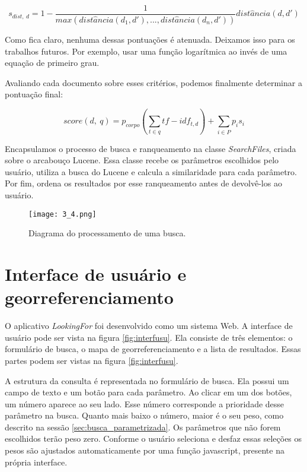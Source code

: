 \begin{displaymath}
	s_{dist,\ d} = 1 - \frac{1}{max(dist\hat{a}ncia(d_{1}, d'), ..., dist\hat{a}ncia(d_{n}, d'))}dist\hat{a}ncia(d, d')
\end{displaymath}

Como fica claro, nenhuma dessas pontuações é atenuada. Deixamos isso para os trabalhos futuros. Por exemplo, usar uma função logarítmica ao invés de uma equação de primeiro grau.

Avaliando cada documento sobre esses critérios, podemos finalmente determinar a pontuação final:

\begin{displaymath}
	score(d,\ q) = p_{corpo} \left(\sum_{t \in q} tf - idf_{t,d}\right) + \sum_{i \in P} p_{i} s_{i}
\end{displaymath}

Encapsulamos o processo de busca e ranqueamento na classe \emph{SearchFiles}, criada sobre o arcabouço Lucene. Essa classe recebe os parâmetros escolhidos pelo usuário, utiliza a busca do Lucene e calcula a similaridade para cada parâmetro. Por fim, ordena os resultados por esse ranqueamento antes de devolvê-los ao usuário.

\begin{figure}[!h]
  \centering
  \texttt{[image: 3\_4.png]} 
  \caption{Diagrama do processamento de uma busca.}
  \label{fig:diagproc} 
\end{figure}

\section{Interface de usuário e georreferenciamento}
\label{sec:interface_usuario}

O aplicativo \emph{LookingFor} foi desenvolvido como um sistema Web. A interface de usuário pode ser vista na figura \ref{fig:interfusu}. Ela consiste de três elementos: o formulário de busca, o mapa de georreferenciamento e a lista de resultados. Essas partes podem ser vistas na figura \ref{fig:interfusu}.

A estrutura da consulta é representada no formulário de busca. Ela possui um campo de texto e um botão para cada parâmetro. Ao clicar em um dos botões, um número aparece ao seu lado. Esse número corresponde a prioridade desse parâmetro na busca. Quanto mais baixo o número, maior é o seu peso, como descrito na sessão \ref{sec:busca_parametrizada}. Os parâmetros que não forem escolhidos terão peso zero. Conforme o usuário seleciona e desfaz essas seleções os pesos são ajustados automaticamente por uma função javascript, presente na própria interface.


